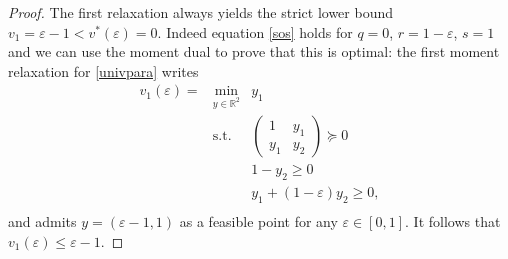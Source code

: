\documentclass[a4paper,12pt]{article}
\newcommand{\R}{\mathbb{R}} %
\begin{document}
\begin{proof}
The first relaxation always yields the strict lower bound $v_1=\varepsilon-1< v^*(\varepsilon)=0$. Indeed equation \eqref{sos} holds for $q=0$, $r=1-\varepsilon$, $s=1$ and we can use the moment dual to prove that this is optimal: the first  moment relaxation
    for \eqref{univpara}
    writes 
    \begin{equation*}
        \begin{array}{rrl}
    v_1(\varepsilon) = & \min_{y \in \R^2} & y_1 \\
    & \mathrm{s.t.} & 
    \left(\begin{array}{cc}
    1 & y_1 \\
    y_1 & y_2
    \end{array}\right) \succeq 0 \\
    & & 1 - y_2 \geq 0 \\
    & & y_1 + (1-\varepsilon)y_2 \geq 0, \\
\end{array}
    \end{equation*}
    and admits $y = (\varepsilon-1, 1)$
    as a feasible point for any $\varepsilon \in [0,1]$. It follows that
    $v_1(\varepsilon) \leq \varepsilon-1$.
\end{proof}
\end{document}
